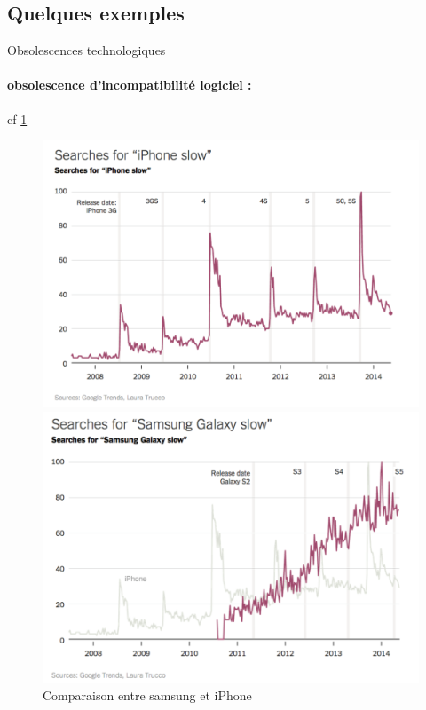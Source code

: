 \subsection{Quelques exemples}


Obsolescences technologiques

\paragraph*{obsolescence d’incompatibilité logiciel :}

cf \ref{compSamsIph}
\begin{figure}[h]

\begin{minipage}{0.5\linewidth}
\includegraphics[scale=0.25]{Rsc/searchForIphoneSlow.png} 
\end{minipage}
\begin{minipage}{0.5\linewidth}
\includegraphics[scale=0.25]{Rsc/searchForSamsungSlow.png} 
\end{minipage}
\caption{Comparaison entre samsung et iPhone}
\label{compSamsIph}
\end{figure}

